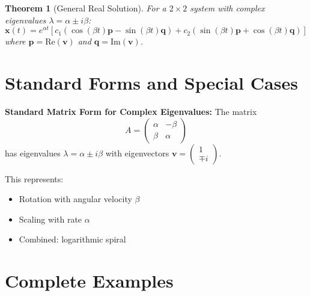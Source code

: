 \documentclass[12pt]{article}
\newtheorem{theorem}{Theorem}
\begin{document}
\begin{theorem}[General Real Solution]
For a $2\times 2$ system with complex eigenvalues $\lambda = \alpha \pm i\beta$:
\[\mathbf{x}(t) = e^{\alpha t}[c_{1}(\cos(\beta t)\mathbf{p} - \sin(\beta t)\mathbf{q}) + c_{2}(\sin(\beta t)\mathbf{p} + \cos(\beta t)\mathbf{q})]\]
where $\mathbf{p} = \text{Re}(\mathbf{v})$ and $\mathbf{q} = \text{Im}(\mathbf{v})$.
\end{theorem}

\section{Standard Forms and Special Cases}

\begin{keypoint}
\textbf{Standard Matrix Form for Complex Eigenvalues:}
The matrix
\[A = \begin{pmatrix} \alpha & -\beta \\ \beta & \alpha \end{pmatrix}\]
has eigenvalues $\lambda = \alpha \pm i\beta$ with eigenvectors $\mathbf{v} = \begin{pmatrix} 1 \\ \mp i \end{pmatrix}$.

This represents:
\begin{itemize}
\item Rotation with angular velocity $\beta$
\item Scaling with rate $\alpha$
\item Combined: logarithmic spiral
\end{itemize}
\end{keypoint}

\section{Complete Examples}
\end{document}
